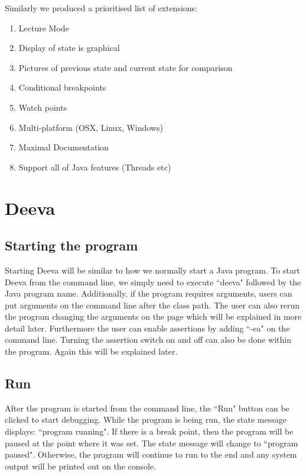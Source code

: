 \documentclass[11pt, a4paper]{article}
\begin{document}
Similarly we produced a prioritised list of extensions:

\begin{enumerate}
\item Lecture Mode
\item Display of state is graphical
\item Pictures of previous state and current state for comparison
\item Conditional breakpoints
\item Watch points
\item Multi-platform (OSX, Linux, Windows)
\item Maximal Documentation
\item Support all of Java features (Threads etc)
\end{enumerate}

\section{Deeva}
\subsection{Starting the program}
Starting Deeva will be similar to how we normally start a Java program.
To start Deeva from the command line, we simply need to execute ``deeva" followed by the Java program name.
Additionally, if the program requires arguments, users can put arguments on the command line after the class path.
The user can also rerun the program changing the arguments on the page which will be explained in more detail later.
Furthermore the user can enable assertions by adding ``-ea" on the command line.
Turning the assertion switch on and off can also be done within the program.
Again this will be explained later.

\subsection{Run}
After the program is started from the command line, the ``Run" button can be clicked to start debugging.
While the program is being run, the state message displays: ``program running".
If there is a break point, then the program will be paused at the point where it was set.
The state message will change to ``program paused".
Otherwise, the program will continue to run to the end and any system output will be printed out on the console.
\end{document}
